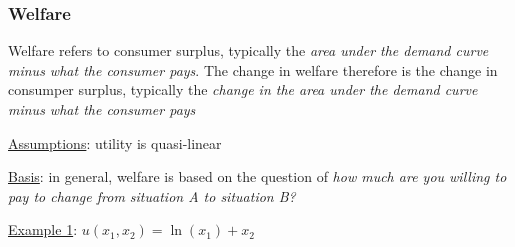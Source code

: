 \documentclass{article}
\begin{document}
\subsubsection{Welfare}
Welfare refers to consumer surplus, typically the \textit{area under the demand curve minus what the consumer pays}. The change in welfare therefore is the change in consumper surplus, typically the \textit{change in the area under the demand curve minus what the consumer pays} \par \vspace{0.3em}
  \underline{Assumptions}: utility is quasi-linear
  \par
  \underline{Basis}: in general, welfare is based on the question of \textit{how much are you willing to pay to change from situation A to situation B?}
  \par
  \underline{Example 1}: $u(x_{1}, x_{2}) = \ln(x_{1}) + x_{2}$
\end{document}
